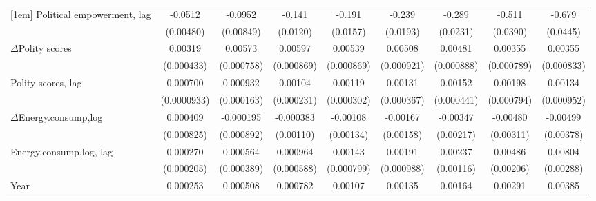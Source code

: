 \begin{table}[htbp]
\begin{tabular}{l*{8}{c}}
[1em]
Political empowerment, lag   &     -0.0512\sym{***}&     -0.0952\sym{***}&      -0.141\sym{***}&      -0.191\sym{***}&      -0.239\sym{***}&      -0.289\sym{***}&      -0.511\sym{***}&      -0.679\sym{***}\\
                    &   (0.00480)         &   (0.00849)         &    (0.0120)         &    (0.0157)         &    (0.0193)         &    (0.0231)         &    (0.0390)         &    (0.0445)         \\
[1em]
$\Delta$Polity scores            &     0.00319\sym{***}&     0.00573\sym{***}&     0.00597\sym{***}&     0.00539\sym{***}&     0.00508\sym{***}&     0.00481\sym{***}&     0.00355\sym{***}&     0.00355\sym{***}\\
                    &  (0.000433)         &  (0.000758)         &  (0.000869)         &  (0.000869)         &  (0.000921)         &  (0.000888)         &  (0.000789)         &  (0.000833)         \\
[1em]
Polity scores, lag            &    0.000700\sym{***}&    0.000932\sym{***}&     0.00104\sym{***}&     0.00119\sym{***}&     0.00131\sym{***}&     0.00152\sym{***}&     0.00198\sym{**} &     0.00134         \\
                    & (0.0000933)         &  (0.000163)         &  (0.000231)         &  (0.000302)         &  (0.000367)         &  (0.000441)         &  (0.000794)         &  (0.000952)         \\
[1em]
$\Delta$Energy.consump,log            &    0.000409         &   -0.000195         &   -0.000383         &    -0.00108         &    -0.00167         &    -0.00347         &    -0.00480         &    -0.00499         \\
                    &  (0.000825)         &  (0.000892)         &   (0.00110)         &   (0.00134)         &   (0.00158)         &   (0.00217)         &   (0.00311)         &   (0.00378)         \\
[1em]
Energy.consump,log, lag            &    0.000270         &    0.000564         &    0.000964         &     0.00143\sym{*}  &     0.00191\sym{*}  &     0.00237\sym{**} &     0.00486\sym{**} &     0.00804\sym{***}\\
                    &  (0.000205)         &  (0.000389)         &  (0.000588)         &  (0.000799)         &  (0.000988)         &   (0.00116)         &   (0.00206)         &   (0.00288)         \\
[1em]
Year                &    0.000253\sym{***}&    0.000508\sym{***}&    0.000782\sym{***}&     0.00107\sym{***}&     0.00135\sym{***}&     0.00164\sym{***}&     0.00291\sym{***}&     0.00385\sym{***}\\

\end{tabular}
\end{table}
